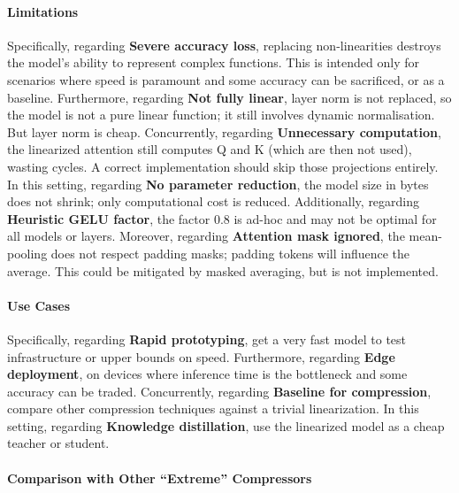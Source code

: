 \paragraph{Limitations}

Specifically, regarding \textbf{Severe accuracy loss}, replacing non-linearities destroys the model's ability to represent complex functions. This is intended only for scenarios where speed is paramount and some accuracy can be sacrificed, or as a baseline. Furthermore, regarding \textbf{Not fully linear}, layer norm is not replaced, so the model is not a pure linear function; it still involves dynamic normalisation. But layer norm is cheap. Concurrently, regarding \textbf{Unnecessary computation}, the linearized attention still computes Q and K (which are then not used), wasting cycles. A correct implementation should skip those projections entirely. In this setting, regarding \textbf{No parameter reduction}, the model size in bytes does not shrink; only computational cost is reduced. Additionally, regarding \textbf{Heuristic GELU factor}, the factor 0.8 is ad-hoc and may not be optimal for all models or layers. Moreover, regarding \textbf{Attention mask ignored}, the mean-pooling does not respect padding masks; padding tokens will influence the average. This could be mitigated by masked averaging, but is not implemented.


\paragraph{Use Cases}

Specifically, regarding \textbf{Rapid prototyping}, get a very fast model to test infrastructure or upper bounds on speed. Furthermore, regarding \textbf{Edge deployment}, on devices where inference time is the bottleneck and some accuracy can be traded. Concurrently, regarding \textbf{Baseline for compression}, compare other compression techniques against a trivial linearization. In this setting, regarding \textbf{Knowledge distillation}, use the linearized model as a cheap teacher or student.


\paragraph{Comparison with Other ``Extreme'' Compressors}


